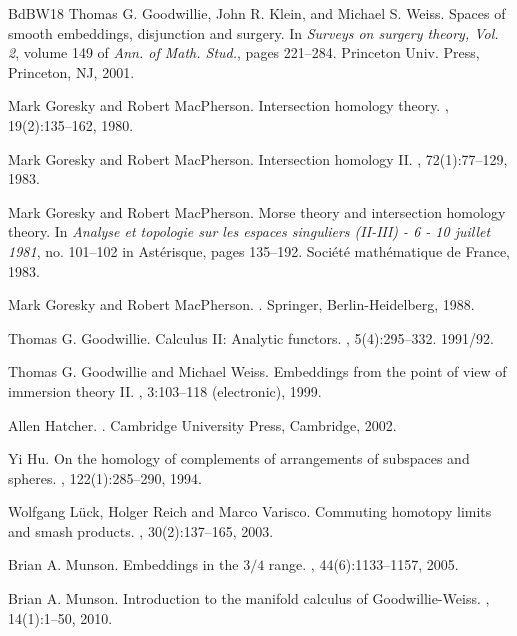 \documentclass[12pt]{amsart}
\theoremstyle{plain}
\theoremstyle{definition}
\theoremstyle{remark}
\begin{document}
\begin{thebibliography}{BdBW18}
Thomas G. Goodwillie, John R. Klein, and Michael S. Weiss.
\newblock Spaces of smooth embeddings, disjunction and surgery.
\newblock In {\em Surveys on surgery theory, {V}ol. 2}, volume 149 of {\em Ann. of Math. Stud.}, pages 221--284. Princeton Univ. Press, Princeton, NJ, 2001.

Mark Goresky and Robert MacPherson.
\newblock Intersection homology theory.
, 19(2):135--162, 1980.

Mark Goresky and Robert MacPherson.
\newblock Intersection homology {II}.
, 72(1):77--129, 1983.

Mark Goresky and Robert MacPherson.
\newblock Morse theory and intersection homology theory.
\newblock In {\em Analyse et topologie sur les espaces singuliers (II-III) - 6 - 10 juillet 1981}, no. 101--102 in Ast\'erisque, pages 135--192. Soci\'et\'e math\'ematique de France, 1983.

Mark Goresky and Robert MacPherson.
.
\newblock Springer, Berlin-Heidelberg, 1988.


Thomas G. Goodwillie.
\newblock Calculus {II}: {A}nalytic functors.
, 5(4):295--332. 1991/92.

Thomas G. Goodwillie and Michael Weiss.
\newblock Embeddings from the point of view of immersion theory {II}.
, 3:103--118 (electronic), 1999.


Allen Hatcher.
.
\newblock Cambridge University Press, Cambridge, 2002.


Yi Hu.
\newblock On the homology of complements of arrangements of subspaces and spheres.
, 122(1):285--290, 1994.


 Wolfgang L{\"u}ck, Holger Reich and Marco Varisco.
\newblock Commuting homotopy limits and smash products.
, 30(2):137--165, 2003. 


 Brian A. Munson.
\newblock Embeddings in the {$3/4$} range.
, 44(6):1133--1157, 2005. 

 Brian A. Munson.
\newblock Introduction to the manifold calculus of {G}oodwillie-{W}eiss.
, 14(1):1--50, 2010.


\end{thebibliography}
\end{document}
